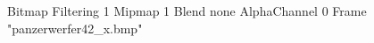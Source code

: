 {Bitmap
	{Filtering 1}
	{Mipmap 1}
	{Blend none}
	{AlphaChannel 0}
	{Frame "panzerwerfer42_x.bmp"}
}
